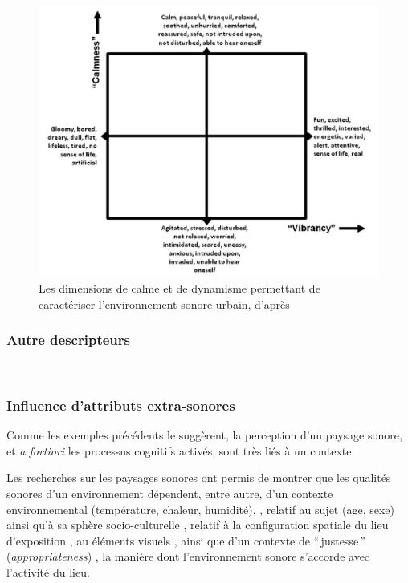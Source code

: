 \begin{figure}[t]
        \myfloatalign
        \includegraphics[width=.8\linewidth]{gfx/calmVibran}
        \caption{Les dimensions de calme et de dynamisme permettant de caractériser l'environnement sonore urbain, d'après \citep{cain2013development}}\label{fig:calmVibran}
\end{figure}

\subsubsection{Autre descripteurs}

 \\

\subsubsection{Influence d'attributs extra-sonores}
\label{sec:ch3_contexteDimension}

Comme les exemples précédents le suggèrent, la perception d'un paysage sonore, et \emph{a fortiori} les processus cognitifs activés, sont très liés à un contexte.

Les recherches sur les paysages sonores ont permis de montrer que les qualités sonores d'un environnement dépendent, entre autre, d'un contexte environnemental (température, chaleur, humidité), \citep{meng2013field,jeon2011non}, relatif au sujet (age, sexe) ainsi qu'à sa sphère socio-culturelle
\citep{hall2013exploratory,yu2010factors,guillen2007importance}, relatif à la configuration spatiale du lieu d'exposition  \citep{hall2013exploratory}, au éléments visuels \citep{de2006quiet,guillen2007importance}, ainsi que d'un contexte de ``\,justesse\,'' (\emph{appropriateness}) \citep{nielbo2013investigating,de2006quiet}, \ie la manière dont l'environnement sonore s'accorde avec l'activité du lieu.
 
